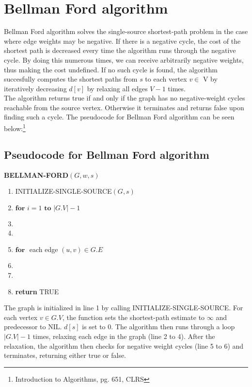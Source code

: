 \documentclass[11pt]{article}
\begin{document}
\section{Bellman Ford algorithm}
Bellman Ford algorithm solves the single-source shortest-path problem in the case where edge weights may be negative. If there is a negative cycle, the cost of the shortest path is decreased every time the algorithm runs through the negative cycle. By doing this numerous times, we can receive arbitrarily negative weights, thus making the cost undefined. If no such cycle is found, the algorithm succesfully computes the shortest paths from $s$ to each vertex $v \in$ V by iteratively decreasing $d[v]$ by relaxing all edges $V-1$ times.\\
The algorithm returns true if and only if the graph has no negative-weight cycles reachable from the source vertex. Otherwise it terminates and returns false upon finding such a cycle. The pseudocode for Bellman Ford algorithm can be seen below:\footnote{Introduction to Algorithms, pg. 651, CLRS}

\subsection{Pseudocode for Bellman Ford algorithm}

\hspace{4ex}\textbf{BELLMAN-FORD$(G, w, s)$}
\begin{enumerate}
\setlength\itemsep{0em}
\item INITIALIZE-SINGLE-SOURCE$(G, s)$
\item $\textbf{for } i = 1 \textbf{ to } |G.V| -1$
\item {}
\item \tab{}
\item $\textbf{for }$ each edge $(u,v) \in G.E$
\item {}
\item \tab{}
\item \textbf{return } TRUE
\end{enumerate}

\noindent The graph is initialized in line 1 by calling INITIALIZE-SINGLE-SOURCE. For each vertex $v \in G.V$, the function sets the shortest-path estimate to $\infty$ and predecessor to NIL. $d[s]$ is set to 0. The algorithm then runs through a loop $|G.V|-1$ times, relaxing each edge in the graph (line 2 to 4). After the relaxation, the algorithm then checks for negative weight cycles (line 5 to 6) and terminates, returning either true or false. 
\end{document}
